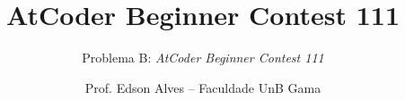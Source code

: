 \title{AtCoder Beginner Contest 111}
\subtitle{Problema B: \textit{AtCoder Beginner Contest 111}}
\date{}
\author{Prof. Edson Alves -- Faculdade UnB Gama}

